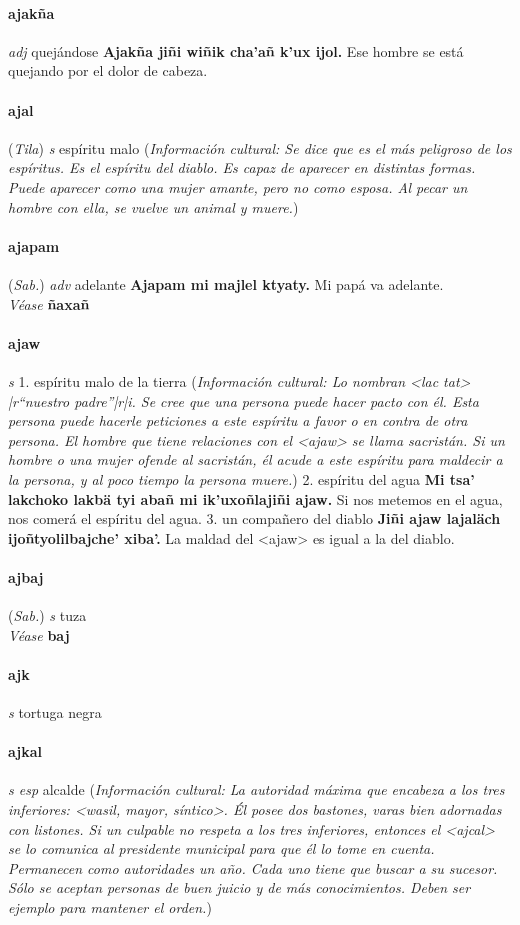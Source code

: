 \documentclass{scrbook}
\newcommand{\entry}[1]{\paragraph{#1}}
\newcommand{\onedefinition}[1]{#1.}
\newcommand{\partofspeech}[1]{\textit{#1}}
\newcommand{\spanishtranslation}[1]{#1}
\newcommand{\cholexample}[1]{\textbf{#1}}
\newcommand{\exampletranslation}[1]{#1}
\newcommand{\alsosee}[1]{\\\textit{Véase} \textbf{#1}}
\newcommand{\relevantdialect}[1]{(\textit{#1})}
\newcommand{\culturalinformation}[1]{(\textit{#1})}
\begin{document}
\begin{multicols}{2}
\entry{ajakña}
\partofspeech{adj}
\spanishtranslation{quejándose}
\cholexample{Ajakña jiñi wiñik cha'añ k'ux ijol.}
\exampletranslation{Ese hombre se está quejando por el dolor de cabeza.}

\entry{ajal}
\relevantdialect{Tila}
\partofspeech{s}
\spanishtranslation{espíritu malo}
\culturalinformation{Información cultural: Se dice que es el más peligroso de los espíritus. Es el espíritu del diablo. Es capaz de aparecer en distintas formas. Puede aparecer como una mujer amante, pero no como esposa. Al pecar un hombre con ella, se vuelve un animal y muere.}

\entry{ajapam}
\relevantdialect{Sab.}
\partofspeech{adv}
\spanishtranslation{adelante}
\cholexample{Ajapam mi majlel ktyaty.}
\exampletranslation{Mi papá va adelante.}
\alsosee{ñaxañ}

\entry{ajaw}
\partofspeech{s}
\onedefinition{1}
\spanishtranslation{espíritu malo de la tierra}
\culturalinformation{Información cultural: Lo nombran <lac tat> |r“nuestro padre”|r|i. Se cree que una persona puede hacer pacto con él. Esta persona puede hacerle peticiones a este espíritu a favor o en contra de otra persona. El hombre que tiene relaciones con el <ajaw> se llama sacristán. Si un hombre o una mujer ofende al sacristán, él acude a este espíritu para maldecir a la persona, y al poco tiempo la persona muere.}
\onedefinition{2}
\spanishtranslation{espíritu del agua}
\cholexample{Mi tsa' lakchoko lakbä tyi abañ mi ik'uxoñlajiñi ajaw.}
\exampletranslation{Si nos metemos en el agua, nos comerá el espíritu del agua.}
\onedefinition{3}
\spanishtranslation{un compañero del diablo}
\cholexample{Jiñi ajaw lajaläch ijoñtyolilbajche' xiba'.}
\exampletranslation{La maldad del <ajaw> es igual a la del diablo.}

\entry{ajbaj}
\relevantdialect{Sab.}
\partofspeech{s}
\spanishtranslation{tuza}
\alsosee{baj}

\entry{ajk}
\partofspeech{s}
\spanishtranslation{tortuga negra}

\entry{ajkal}
\partofspeech{s esp}
\spanishtranslation{alcalde}
\culturalinformation{Información cultural: La autoridad máxima que encabeza a los tres inferiores: <wasil, mayor, síntico>. Él posee dos bastones, varas bien adornadas con listones. Si un culpable no respeta a los tres inferiores, entonces el <ajcal> se lo comunica al presidente municipal para que él lo tome en cuenta. Permanecen como autoridades un año. Cada uno tiene que buscar a su sucesor. Sólo se aceptan personas de buen juicio y de más conocimientos. Deben ser ejemplo para mantener el orden.}


\end{multicols}
\end{document}
